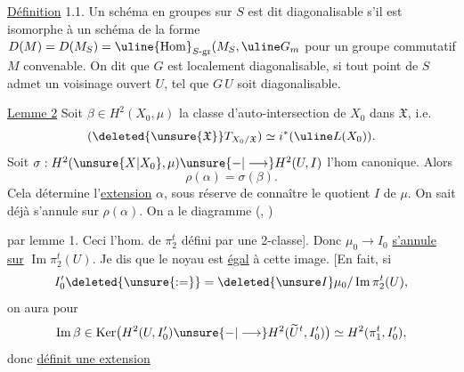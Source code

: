 \uline{Définition} 1.1. Un schéma en groupes  sur $S$ est dit diagonalisable
s'il est isomorphe à un schéma de la forme 
$D(M)=D(M_S)=\uline{\operatorname{Hom}}_{S\text{-gr}}(M_S,\uline G_m$
pour un groupe commutatif $M$ convenable. On dit que $G$ est localement
diagonalisable, si tout point de $S$ admet un voisinage ouvert $U$, tel que
$G\,U$ soit diagonalisable.


\uline{Lemme 2} Soit $\beta\in H^2(X_0,\mu)$ la classe d'auto-intersection
de $X_0$ dans $\mathfrak X$, i.e.
\[
(\deleted{\unsure{\mathfrak X}}T_{X_0/\mathfrak X})
\simeq i^*(\uline L(X_0)).
\]
Soit $\sigma:H^2(\unsure{X|X_0},\mu)\unsure{-|\longrightarrow}H^2(U,I)$
l'hom canonique.
Alors
\[
\rho(\alpha)=\sigma(\beta).
\]
Cela détermine l'\uline{extension} $\alpha$, sous
réserve de connaître le quotient $I$ de $\mu$.
On sait déjà 
\deleted{\unsure{$\rho\beta$}}
s'annule sur $\rho(\alpha)$. On a le diagramme
(, )

par lemme 1. Ceci  l'hom.
 de $\pi_2^t$ défini par une 2-classe].
Donc 
$\mu_0\longrightarrow I_0$ \uline{s'annule sur}
$\operatorname{Im}\pi_2^t(U)$. Je dis que 
le noyau est \uline{égal} à cette image.
[En fait, si
\[
I'_0\deleted{\unsure{:=}}=\deleted{\unsure I}
\mu_0/\operatorname{Im}\pi_2^t(U),
\]
on aura pour
\[
\operatorname{Im}\beta\in
\operatorname{Ker}\bigl(H^2(U,I'_0)\unsure{-|\longrightarrow}
H^2(\widetilde U^t,I'_0)\bigr)
\simeq H^2(\pi_1^t,I'_0),
\]
donc 
\uline{définit une extension}

